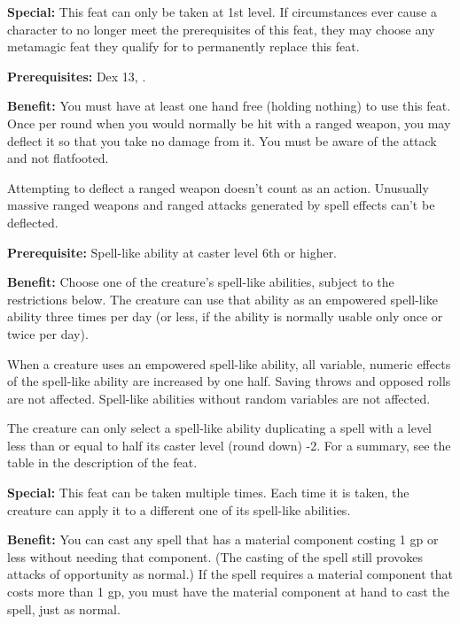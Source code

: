 \textbf{Special:} This feat can only be taken at 1st level. If circumstances ever cause a character to no longer meet the prerequisites of this feat, they may choose any metamagic feat they qualify for to permanently replace this feat.


\textbf{Prerequisites:} Dex 13, .

\textbf{Benefit:} You must have at least one hand free (holding nothing) to use this feat. Once per round when you would normally be hit with a ranged weapon, you may deflect it so that you take no damage from it. You must be aware of the attack and not flatfooted.

Attempting to deflect a ranged weapon doesn't count as an action. Unusually massive ranged weapons and ranged attacks generated by spell effects can't be deflected.


\textbf{Prerequisite:} Spell-like ability at caster level 6th or higher.

\textbf{Benefit:} Choose one of the creature's spell-like abilities, subject to the restrictions below. The creature can use that ability as an empowered spell-like ability three times per day (or less, if the ability is normally usable only once or twice per day).

When a creature uses an empowered spell-like ability, all variable, numeric effects of the spell-like ability are increased by one half. Saving throws and opposed rolls are not affected. Spell-like abilities without random variables are not affected.

The creature can only select a spell-like ability duplicating a spell with a level less than or equal to half its caster level (round down) -2. For a summary, see the table in the description of the  feat. 

\textbf{Special:} This feat can be taken multiple times. Each time it is taken, the creature can apply it to a different one of its spell-like abilities.


\textbf{Benefit:} You can cast any spell that has a material component costing 1 gp or less without needing that component. (The casting of the spell still provokes attacks of opportunity as normal.) If the spell requires a material component that costs more than 1 gp, you must have the material component at hand to cast the spell, just as normal.

